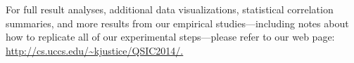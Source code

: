 
For full result analyses, additional data visualizations, statistical correlation summaries, and more results from our
empirical studies---including notes about how to replicate all of our experimental steps---please refer to our web page:
\url{http://cs.uccs.edu/~kjustice/QSIC2014/.}


